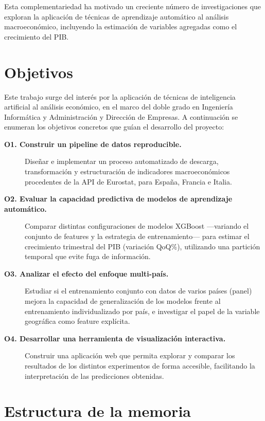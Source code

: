 Esta complementariedad ha motivado un creciente número de investigaciones que exploran la aplicación de técnicas de aprendizaje automático al análisis macroeconómico, incluyendo la estimación de variables agregadas como el crecimiento del PIB. \citet{pascual_ruiz_ml_series_2021}

\section{Objetivos}

Este trabajo surge del interés por la aplicación de técnicas de inteligencia artificial al análisis económico, en el marco del doble grado en Ingeniería Informática y Administración y Dirección de Empresas. A continuación se enumeran los objetivos concretos que guían el desarrollo del proyecto:

\begin{description}
    \item[\textbf{O1. Construir un pipeline de datos reproducible.}] Diseñar e implementar un proceso automatizado de descarga, transformación y estructuración de indicadores macroeconómicos procedentes de la API de Eurostat, para España, Francia e Italia.

    \item[\textbf{O2. Evaluar la capacidad predictiva de modelos de aprendizaje automático.}] Comparar distintas configuraciones de modelos XGBoost ---variando el conjunto de features y la estrategia de entrenamiento--- para estimar el crecimiento trimestral del PIB (variación QoQ\%), utilizando una partición temporal que evite fuga de información.

    \item[\textbf{O3. Analizar el efecto del enfoque multi-país.}] Estudiar si el entrenamiento conjunto con datos de varios países (panel) mejora la capacidad de generalización de los modelos frente al entrenamiento individualizado por país, e investigar el papel de la variable geográfica como feature explícita.

    \item[\textbf{O4. Desarrollar una herramienta de visualización interactiva.}] Construir una aplicación web que permita explorar y comparar los resultados de los distintos experimentos de forma accesible, facilitando la interpretación de las predicciones obtenidas.
\end{description}

\section{Estructura de la memoria}

